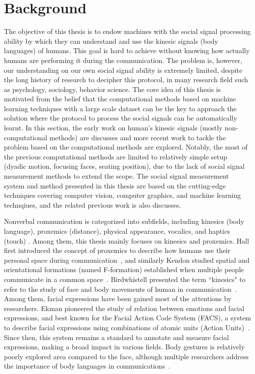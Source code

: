 
\chapter{Background}

The objective of this thesis is to endow machines with the social signal processing ability by which they can understand and use the kinesic signals (body languages)  of humans. This goal is hard to achieve without knowing how actually humans are performing it during the communication.  The problem is, however, our understanding on our own social signal ability is extremely limited, despite the long history of research to decipher this protocol, in many research field such as psychology, sociology, behavior science. The core idea of this thesis is motivated from the belief that the computational methods based on machine learning techniques with a large scale dataset can be the key to approach the solution where the protocol to process the social signals can be automatically learnt. In this section, the early work on human's kinesic signals (mostly non-computational methods) are discusses and more recent work to tackle the problem based on the computational methods are explored. Notably, the most of the previous computational methods are limited to relatively simple setup (dyadic motion, focusing faces, seating position), due to the lack of social signal measurement methods to extend the scope. The  social signal measurement system and method presented in this thesis are based on the cutting-edge techniques covering computer vision, computer graphics, and machine learning technqiues, and the related previous work is also discusses. 


Nonverbal communication is categorized into subfields, including kinesics (body language), proxemics (distance),  physical appearance,  vocalics,  and haptics (touch) \cite{}. Among them, this thesis mainly focuses on kinesics and proxemics. Hall first introduced the concept of proxemics to describe how humans use their personal space during communication~\cite{Hall66}, and similarly Kendon studied spatial and orientational formations (named F-formation) established when multiple people communicate in a common space~\cite{kendon90}. Birdwhistell presented the term ``kinesics" to refer to the study of face and body movements of human in communication~\cite{Birdwhistell52, ekman1969}. Among them, facial expressions have been gained most of the attentions by researchers. Ekman pioneered the study of relation between emotions and facial expressions, and best known for the Facial Action Code System (FACS), a system to describe facial expressions using combinations of atomic units (Action Units)~\cite{ekman1977facial}. Since then, this system remains a standard to annotate and measure facial expressions, making a broad impact in various fields. Body gestures is relatively poorly explored area compared to the face, although multiple researchers address the importance of body languages in communications~\cite{Gelder09, Moore13, Meeren-2005, Aviezer-2012}. 


